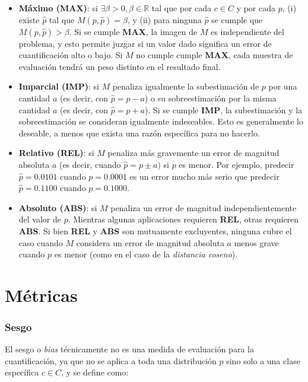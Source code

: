 \begin{itemize}
    \item {\bf Máximo (MAX)}: si $\exists \beta >0, \beta \in \mathbb{R}$ tal
    que por cada $c \in C$ y por cada $p$, (i) existe $\hat p$ tal que $M(p,
    \hat p) = \beta$, y (ii) para ninguna $\hat p$ se cumple que $M(p, \hat p) >
    \beta$. Si se cumple {\bf MAX}, la imagen de $M$ es independiente del
    problema, y esto permite juzgar si un valor dado significa un error de
    cuantificación alto o bajo. Si $M$ no cumple cumple {\bf MAX}, cada muestra
    de evaluación tendrá un peso distinto en el resultado final.
    \item {\bf Imparcial (IMP)}: si $M$ penaliza igualmente la subestimación de
    $p$ por una cantidad $a$ (es decir, con $\hat p = p - a$) o su
    sobreestimación por la misma cantidad $a$ (es decir, con $\hat p = p + a$).
    Si se cumple {\bf IMP}, la subestimación y la sobreestimación se consideran
    igualmente indeseables. Esto es generalmente lo deseable, a menos que exista
    una razón específica para no hacerlo.
    \item {\bf Relativo (REL)}: si $M$ penaliza más gravemente un error de
    magnitud absoluta $a$ (es decir, cuando $\hat p = p \pm a)$ si $p$ es menor.
    Por ejemplo, predecir $\hat p = 0.0101$ cuando $p = 0.0001$ es un error
    mucho más serio que predecir $\hat p = 0.1100$ cuando $p = 0.1000$.
    \item {\bf Absoluto (ABS)}: si $M$ penaliza un error de magnitud
    independientemente del valor de $p$. Mientras algunas aplicaciones requieren
    {\bf REL}, otras requieren {\bf ABS}. Si bien {\bf REL} y {\bf ABS} son
    mutuamente excluyentes, ninguna cubre el caso cuando $M$ considera un error
    de magnitud absoluta $a$ menos grave cuando $p$ es menor (como en el caso de
    la {\it distancia coseno\/}).
\end{itemize}

\section{Métricas}\label{evaluacion:metricas}

\subsubsection{Sesgo}\label{evaluacion:bias}

El sesgo o {\it bias\/} técnicamente no es una medida de evaluación para la
cuantificación, ya que no se aplica a toda una distribución $p$ sino solo a una
clase específica $c \in C$, y se define como:

